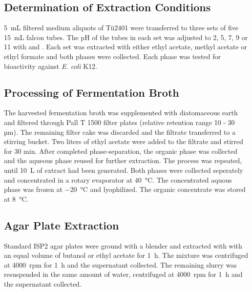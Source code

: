
	\subsection{Determination of Extraction Conditions} %
	\label{sub:determination_of_extraction_conditions}

	\SI{5}{\milli\liter} filtered medium aliquots of Tü2401 were transferred to three sets of five \SI{15}{\milli\liter} falcon tubes. The pH of the tubes in each set was adjusted to 2, 5, 7, 9 or 11 with  and . Each set was extracted with either ethyl acetate, methyl acetate or ethyl formate and both phases were collected. Each phase was tested for bioactivity against \textit{E. coli} K12.


	\subsection{Processing of Fermentation Broth} %
	\label{sub:processing_of_fermentation_broth}
	The harvested fermentation broth was supplemented with diatomaceous earth and filtered through Pall T 1500 filter plates (relative retention range 10 - 30 µm). The remaining filter cake was discarded and the filtrate transferred to a stirring bucket. Two liters of ethyl acetate were added to the filtrate and stirred for 30 min. After completed phase-separation, the organic phase was collected and the aqueous phase reused for further extraction. The process was repeated, until \SI{10}{\liter} of extract had been generated. Both phases were collected seperately and concentrated in a rotary evaporator at \SI{40}{\celsius}. The concentrated aquous phase was frozen at \SI{-20}{\celsius} and lyophilized. The organic concentrate was stored at \SI{8}{\celsius}.

	\subsection{Agar Plate Extraction} %
	\label{sub:agar_plate_extraction}

	Standard ISP2 agar plates were ground with a blender and extracted with with an equal volume of butanol or ethyl acetate for \SI{1}{\hour}. The mixture was centrifuged at 4000~rpm for \SI{1}{\hour} and the supernatant collected. The remaining slurry was resuspended in the same amount of water, centrifuged at 4000~rpm for \SI{1}{\hour} and the supernatant collected.

